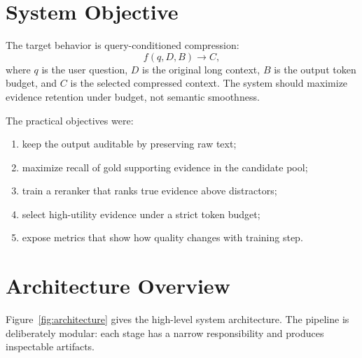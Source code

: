 \documentclass[10pt,twocolumn]{article}
\begin{document}
\section{System Objective}
The target behavior is query-conditioned compression:
\[
f(q, D, B) \rightarrow C,
\]
where $q$ is the user question, $D$ is the original long context, $B$ is the output token budget, and $C$ is the selected compressed context. The system should maximize evidence retention under budget, not semantic smoothness.

The practical objectives were:
\begin{enumerate}
\item keep the output auditable by preserving raw text;
\item maximize recall of gold supporting evidence in the candidate pool;
\item train a reranker that ranks true evidence above distractors;
\item select high-utility evidence under a strict token budget;
\item expose metrics that show how quality changes with training step.
\end{enumerate}

\section{Architecture Overview}
Figure~\ref{fig:architecture} gives the high-level system architecture. The pipeline is deliberately modular: each stage has a narrow responsibility and produces inspectable artifacts.
\end{document}
